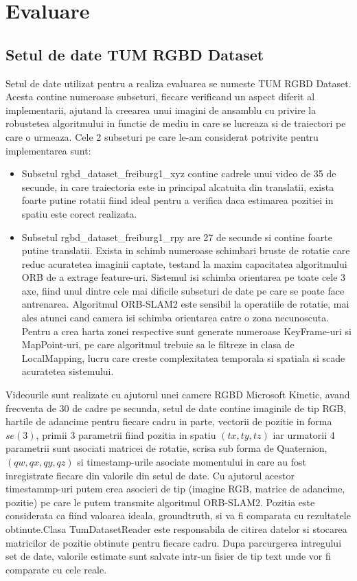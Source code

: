 \documentclass[12pt,a4paper]{report}
\begin{document}
\chapter{Evaluare}
\section{Setul de date TUM RGBD Dataset}
Setul de date utilizat pentru a realiza evaluarea se numeste TUM RGBD Dataset. 
Acesta contine numeroase subseturi, fiecare verificand un aspect diferit al implementarii, 
ajutand la creearea unui imagini de ansamblu cu privire la robustetea algoritmului in functie 
de mediu in care se lucreaza si de traiectori pe care o urmeaza. Cele 2 subseturi pe 
care le-am considerat potrivite pentru implementarea sunt:
\begin{itemize}
    \item Subsetul rgbd\_dataset\_freiburg1\_xyz contine cadrele unui video de 35 de secunde, in care
traiectoria este in principal alcatuita din translatii, exista foarte putine rotatii fiind
ideal pentru a verifica daca estimarea pozitiei in spatiu este corect realizata.    
    \item  Subsetul rgbd\_dataset\_freiburg1\_rpy are 27 de secunde si contine 
foarte putine translatii. Exista in schimb numeroase schimbari bruste de rotatie care reduc
acuratetea imaginii captate, testand la maxim capacitatea algoritmului ORB de a extrage 
feature-uri. Sistemul isi schimba orientarea pe toate cele 3 axe, fiind unul dintre cele
mai dificile subseturi de date pe care se poate face antrenarea. Algoritmul 
ORB-SLAM2 este sensibil la operatiile de rotatie, mai ales atunci cand camera isi schimba 
orientarea catre o zona necunoscuta. Pentru a crea harta zonei respective sunt generate 
numeroase KeyFrame-uri si MapPoint-uri, pe care algoritmul trebuie sa le filtreze in clasa
de LocalMapping, lucru care creste complexitatea temporala si spatiala si scade acuratetea
sistemului.  
\end{itemize}   
Videourile sunt realizate 
cu ajutorul unei camere RGBD Microsoft Kinetic, avand frecventa de 30 de cadre pe secunda, 
setul de date contine imaginile de tip RGB, hartile de adancime pentru fiecare cadru in parte,
vectorii de pozitie in forma $ se(3) $, primii 3 parametrii fiind pozitia in spatiu 
$ (tx, ty, tz) $ iar urmatorii 4 parametrii sunt asociati matricei de rotatie, scrisa sub
forma de Quaternion, $ (qw, qx, qy, qz) $ si timestamp-urile asociate momentului in care 
au fost inregistrate fiecare din valorile din setul de date. Cu ajutorul acestor timestammp-uri
putem crea asocieri de tip (imagine RGB, matrice de adancime, pozitie) pe care le putem 
transmite algoritmul ORB-SLAM2. Pozitia este considerata ca fiind valoarea ideala, groundtruth,
si va fi comparata cu rezultatele obtinute.Clasa TumDatasetReader este responsabila de citirea
datelor si stocarea matricilor de pozitie obtinute pentru fiecare cadru. Dupa parcurgerea 
intregului set de date, valorile estimate sunt salvate intr-un fisier de tip text unde vor 
fi comparate cu cele reale.
\end{document}
